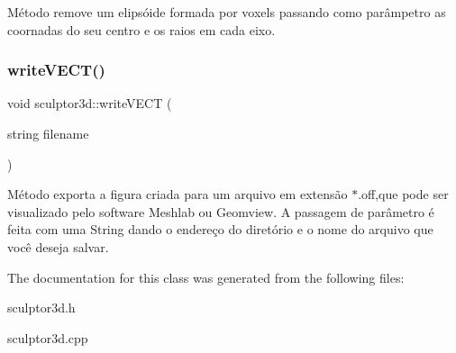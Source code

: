 Método remove um elipsóide formada por voxels passando como parâmpetro as coornadas do seu centro e os raios em cada eixo. \mbox{\label{classsculptor3d_a60f471805c52556e564477beccc72f6b}} 
\subsubsection{\texorpdfstring{write\+V\+E\+C\+T()}{writeVECT()}}
{\footnotesize\ttfamily void sculptor3d\+::write\+V\+E\+CT (\begin{DoxyParamCaption}\item[{string}]{filename }\end{DoxyParamCaption})}

Método exporta a figura criada para um arquivo em extensão $\ast$.off,que pode ser visualizado pelo software Meshlab ou Geomview. A passagem de parâmetro é feita com uma String dando o endereço do diretório e o nome do arquivo que você deseja salvar. 

The documentation for this class was generated from the following files\+:\begin{DoxyCompactItemize}
\item 
sculptor3d.\+h\item 
sculptor3d.\+cpp\end{DoxyCompactItemize}
